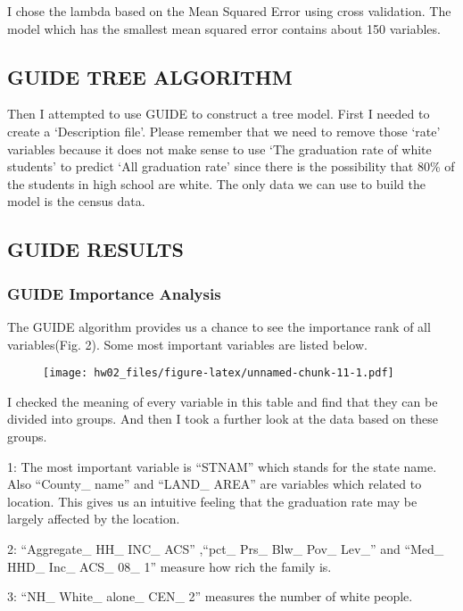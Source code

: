 \documentclass[]{article}
\begin{document}
I chose the lambda based on the Mean Squared Error using cross
validation. The model which has the smallest mean squared error contains
about 150 variables.

\subsection{GUIDE TREE ALGORITHM}\label{guide-tree-algorithm}

Then I attempted to use GUIDE to construct a tree model. First I needed
to create a `Description file'. Please remember that we need to remove
those `rate' variables because it does not make sense to use `The
graduation rate of white students' to predict `All graduation rate'
since there is the possibility that 80\% of the students in high school
are white. The only data we can use to build the model is the census
data.

\subsection{GUIDE RESULTS}\label{guide-results}

\subsubsection{GUIDE Importance
Analysis}\label{guide-importance-analysis}

The GUIDE algorithm provides us a chance to see the importance rank of
all variables(Fig. 2). Some most important variables are listed below.

\begin{figure}[H]
\centering
\texttt{[image: hw02\_files/figure-latex/unnamed-chunk-11-1.pdf]}
\caption{}
\end{figure}

I checked the meaning of every variable in this table and find that they
can be divided into groups. And then I took a further look at the data
based on these groups.

1: The most important variable is ``STNAM'' which stands for the state
name. Also ``County\_ name'' and ``LAND\_ AREA'' are variables which
related to location. This gives us an intuitive feeling that the
graduation rate may be largely affected by the location.

2: ``Aggregate\_ HH\_ INC\_ ACS'' ,``pct\_ Prs\_ Blw\_ Pov\_ Lev\_'' and
``Med\_ HHD\_ Inc\_ ACS\_ 08\_ 1'' measure how rich the family is.

3: ``NH\_ White\_ alone\_ CEN\_ 2'' measures the number of white people.
\end{document}
